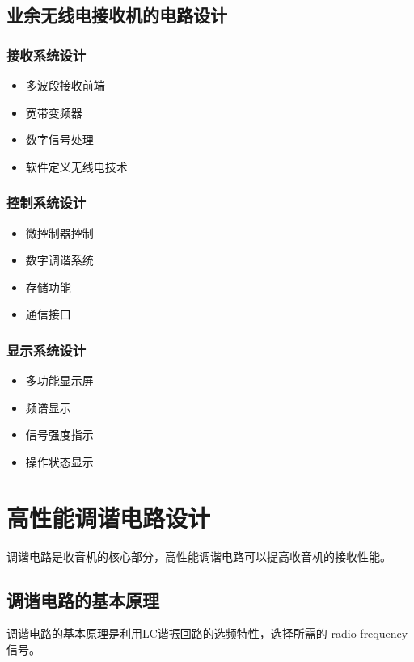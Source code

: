 \documentclass[12pt,UTF8]{ctexbook}
\begin{document}
\section{业余无线电接收机的电路设计}

\subsection{接收系统设计}\begin{itemize}
  \item 多波段接收前端
  \item 宽带变频器
  \item 数字信号处理
  \item 软件定义无线电技术\end{itemize}

\subsection{控制系统设计}\begin{itemize}
  \item 微控制器控制
  \item 数字调谐系统
  \item 存储功能
  \item 通信接口\end{itemize}

\subsection{显示系统设计}\begin{itemize}
  \item 多功能显示屏
  \item 频谱显示
  \item 信号强度指示
  \item 操作状态显示\end{itemize}

\chapter{高性能调谐电路设计}

调谐电路是收音机的核心部分，高性能调谐电路可以提高收音机的接收性能。

\section{调谐电路的基本原理}

调谐电路的基本原理是利用LC谐振回路的选频特性，选择所需的 radio frequency信号。
\end{document}
